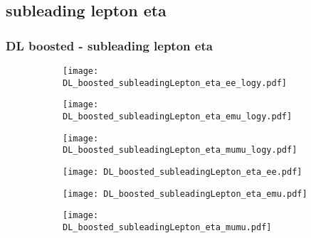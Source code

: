\documentclass[aspectratio=169,8pt]{beamer}
\begin{document}
\subsection{subleading lepton eta}
\begin{frame}
\frametitle{DL boosted - subleading lepton eta}
\begin{figure}
\captionsetup[subfigure]{labelformat=empty}
\begin{subfigure}{0.32\textwidth}
\texttt{[image: DL\_boosted\_subleadingLepton\_eta\_ee\_logy.pdf]}
\vspace*{-0.15cm}
\end{subfigure}
\hfil
\begin{subfigure}{0.32\textwidth}
\texttt{[image: DL\_boosted\_subleadingLepton\_eta\_emu\_logy.pdf]}
\vspace*{-0.15cm}
\end{subfigure}
\hfil
\begin{subfigure}{0.32\textwidth}
\texttt{[image: DL\_boosted\_subleadingLepton\_eta\_mumu\_logy.pdf]}
\vspace*{-0.15cm}
\end{subfigure}
\hfil
\begin{subfigure}{0.32\textwidth}
\texttt{[image: DL\_boosted\_subleadingLepton\_eta\_ee.pdf]}
\vspace*{-0.15cm}
\end{subfigure}
\hfil
\begin{subfigure}{0.32\textwidth}
\texttt{[image: DL\_boosted\_subleadingLepton\_eta\_emu.pdf]}
\vspace*{-0.15cm}
\end{subfigure}
\hfil
\begin{subfigure}{0.32\textwidth}
\texttt{[image: DL\_boosted\_subleadingLepton\_eta\_mumu.pdf]}
\vspace*{-0.15cm}
\end{subfigure}
\hfil
\end{figure}
\end{frame}
\newpage
\end{document}
